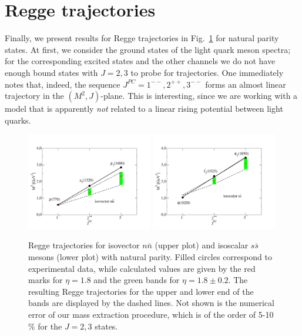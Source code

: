 \section{Regge trajectories}\label{res:regge}
Finally, we present results for Regge trajectories in Fig.~\ref{fig:regge} for natural parity states. 
At first, we consider the ground states of the light quark meson spectra; for the corresponding excited states and the 
other channels we do not have enough bound states with $J=2,3$ to probe for trajectories. 
One immediately notes that, indeed, the sequence $J^{PC}=1^{--}, 2^{++}, 3^{--}$ forms an almost linear
trajectory in the $(M^2,J)$-plane. This is interesting, since we are working with a model that is
apparently \emph{not} related to a linear rising potential between light quarks. 
\begin{figure}[h]
\begin{center}
\includegraphics[width=0.49\textwidth]{figures/reggenn_v2}
\includegraphics[width=0.49\textwidth]{figures/reggess_v2}
\caption{\small Regge trajectories for isovector $n\bar{n}$ (upper plot)
and isoscalar $s\bar{s}$ mesons (lower plot) with natural parity. 
Filled circles correspond to experimental data, while calculated values are given by the red marks
for $\eta = 1.8$ and the green bands for $\eta = 1.8 \pm 0.2$. The resulting Regge trajectories for 
the upper and lower end of the bands are displayed by the dashed lines. Not shown is the numerical
error of our mass extraction procedure, which is of the order of 5-10 $\%$ for the $J=2,3$ states.}\label{fig:regge}
\end{center}
\end{figure} 
